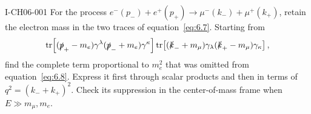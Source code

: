 \begin{exercise}{I-CH06-001}
For the process
\(e^-(p_-)+e^+(p_+)\to\mu^-(k_-)+\mu^+(k_+)\), retain the electron
mass in the two traces of equation~\eqref{eq:6.7}.  Starting from
\[
 \operatorname{tr}\!\left[(\slashed p_+-m_e)\gamma^\lambda
 (\slashed p_-+m_e)\gamma^\kappa\right]
 \operatorname{tr}\!\left[(\slashed k_-+m_\mu)\gamma_\lambda
 (\slashed k_+-m_\mu)\gamma_\kappa\right],
\]
find the complete term proportional to \(m_e^2\) that was omitted from
equation~\eqref{eq:6.8}.  Express it first through scalar products and then
in terms of \(q^2=(k_-+k_+)^2\).  Check its suppression in the
center-of-mass frame when \(E\gg m_\mu,m_e\).
\end{exercise}
